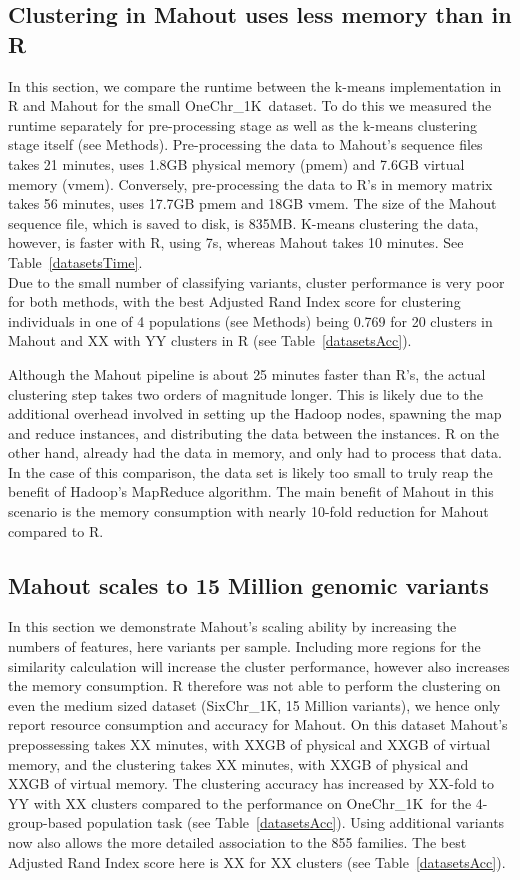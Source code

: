 \documentclass[twocolumn]{bmcart}%
\newcommand{\OneReal}{OneChr\_1K}
\newcommand{\SixReal}{SixChr\_1K}
\begin{document}
\subsection*{Clustering in Mahout uses less memory than in R}
In this section, we compare the runtime between the k-means implementation in R and Mahout for the small \OneReal\ dataset. 
To do this we measured the runtime separately for pre-processing stage as well as the k-means clustering stage itself (see Methods). 
Pre-processing the data to Mahout's sequence files takes 21 minutes, uses 1.8GB physical memory (pmem) and 7.6GB virtual memory (vmem).
Conversely,  pre-processing the data to R's in memory matrix takes 56 minutes, uses 17.7GB pmem and 18GB vmem. 
The size of the Mahout sequence file, which is saved to disk, is 835MB. 
K-means clustering the data, however, is faster with R, using 7s, whereas Mahout takes 10 minutes. See Table~\ref{datasetsTime}. \\
Due to the small number of classifying variants, cluster performance is very poor for both methods, with the best Adjusted Rand Index score for clustering individuals in one of 4 populations (see Methods) being 0.769 for 20 clusters in Mahout and XX with YY clusters in R (see Table~\ref{datasetsAcc}).

Although the Mahout pipeline is about 25 minutes faster than R's, the actual clustering step takes two orders of magnitude longer. 
This is likely due to the additional overhead involved in setting up the Hadoop nodes, spawning the map and reduce instances, and distributing the data between the instances. 
R on the other hand, already had the data in memory, and only had to process that data. 
In the case of this comparison, the data set is likely too small to truly reap the benefit of Hadoop's MapReduce algorithm. 
The main benefit of Mahout in this scenario is the memory consumption with nearly 10-fold reduction for Mahout compared to R. 


\subsection*{Mahout scales to 15 Million genomic variants}
In this section we demonstrate Mahout's scaling ability by increasing the numbers of features, here variants per sample. 
Including more regions for the similarity calculation will increase the cluster performance, however also increases the memory consumption. 
R therefore was not able to perform the clustering on even the medium sized dataset (\SixReal , 15 Million variants), we hence only report resource consumption and accuracy for Mahout.
On this dataset Mahout's prepossessing takes XX minutes, with XXGB of physical and XXGB of virtual memory, and the clustering takes XX minutes, with XXGB of physical and XXGB of virtual memory. 
The clustering accuracy has increased by XX-fold to YY with XX clusters compared to the performance on \OneReal\ for the 4-group-based population task (see Table~\ref{datasetsAcc}).
Using additional variants now also allows the more detailed association to the 855 families.
The best Adjusted Rand Index score here is XX for XX clusters (see Table~\ref{datasetsAcc}).
\end{document}
